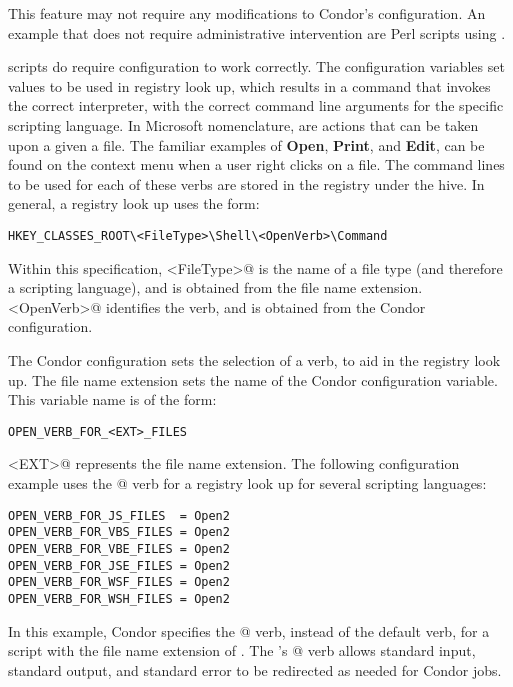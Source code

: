 This feature may not require any modifications to Condor's configuration.  
An example that does not require administrative intervention
are Perl scripts using .

 scripts do require
configuration to work correctly.
The configuration variables set values to be used in registry look up,
which results in a command that invokes the correct interpreter,
with the correct command line arguments for the specific scripting
language.
In Microsoft nomenclature, 
 are actions that can be taken upon a given a file.
The familiar examples of
\textbf{Open}, \textbf{Print}, and \textbf{Edit},
can be found on the context menu when a user right clicks on a file.
The command lines to be used for each of these verbs are stored in
the registry under the  hive.
In general, a registry look up uses the form:

\footnotesize
\begin{verbatim}
HKEY_CLASSES_ROOT\<FileType>\Shell\<OpenVerb>\Command
\end{verbatim}
\normalsize

Within this specification, 
\verb@<FileType>@ is the name of a file type
(and therefore a scripting language),
and is obtained from the file name extension.
\verb@<OpenVerb>@ identifies the verb,
and is obtained from the Condor configuration.

The Condor configuration sets the selection of a verb,
to aid in the registry look up.
The file name extension sets the name of the Condor configuration variable.
This variable name is of the form:
\begin{verbatim}
OPEN_VERB_FOR_<EXT>_FILES
\end{verbatim}
\verb@<EXT>@ represents the file name extension.
The following configuration example uses the @ verb for
a  registry look up for several scripting
languages:

\begin{verbatim}
OPEN_VERB_FOR_JS_FILES  = Open2
OPEN_VERB_FOR_VBS_FILES = Open2
OPEN_VERB_FOR_VBE_FILES = Open2
OPEN_VERB_FOR_JSE_FILES = Open2
OPEN_VERB_FOR_WSF_FILES = Open2
OPEN_VERB_FOR_WSH_FILES = Open2
\end{verbatim}

In this example, Condor specifies the @ verb,
instead of the default \verb@Open@ verb,
for a script with the file name extension of \verb@wsh@.
The 's @ verb allows standard input,
standard output, and standard error to be redirected
as needed for Condor jobs.

